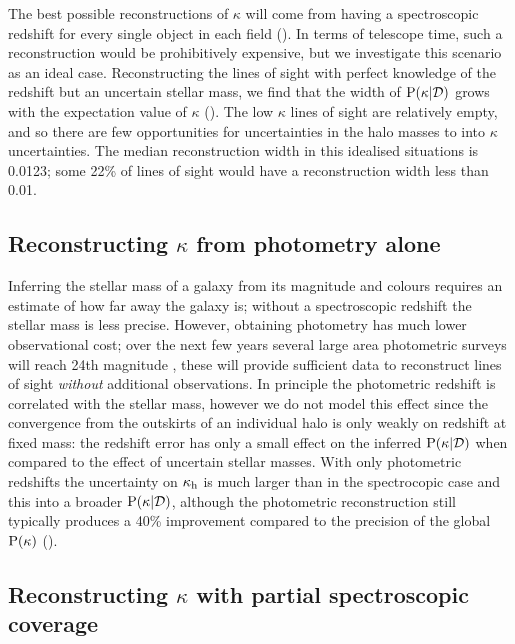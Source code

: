 \documentclass[useAMS,usenatbib]{mn2e}
\begin{document}
The best possible reconstructions of $\kappa$ will come from having a
spectroscopic redshift for every single object in each field
().  In terms of telescope time, such a reconstruction
would be prohibitively expensive, but we investigate this scenario as an ideal
case. Reconstructing the lines of sight with perfect knowledge of the redshift
but an uncertain stellar mass, we find that the width of ${\rm P}(\kappa|{\mathcal{D}})$
grows with the expectation value of $\kappa$ (). The low
$\kappa$ lines of sight are relatively empty, and so there are few
opportunities for uncertainties in the halo masses to \propogate into $\kappa$
uncertainties. The median reconstruction width in this idealised situations is
0.0123; some 22\% of lines of sight would have a reconstruction width less
than 0.01. 



\subsection{Reconstructing $\kappa$ from photometry alone}

Inferring the stellar mass of a galaxy from its magnitude and colours requires
an estimate of how far away the galaxy is; without a spectroscopic redshift
the \infered stellar mass is less precise. However, obtaining photometry has
much lower observational cost; over the next few years several large area
photometric surveys will reach 24th magnitude \citep{Euclid,LSST}, these will
provide sufficient data to reconstruct lines of sight {\it without} additional
observations. In principle the photometric redshift is correlated with the
\infered stellar mass, however we do not model this effect since the
convergence from the outskirts of an individual halo is only weakly \dependant
on redshift at fixed mass: the redshift error has only a small effect on the
inferred ${\rm P}(\kappa|{\mathcal{D}})$ when compared to the effect of uncertain stellar
masses.  With only photometric redshifts the uncertainty on
$\kappa_{\rm h}$ is much larger than in the spectrocopic case and this
\propogates into a broader ${\rm P}(\kappa|{\mathcal{D}})$, although the photometric
reconstruction still typically produces a 40\% improvement compared to the
precision of the global ${\rm P}(\kappa)$ ().


\subsection{Reconstructing $\kappa$ with partial spectroscopic coverage}
\end{document}

